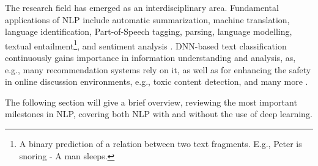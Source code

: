 The research field has emerged as an interdisciplinary area. Fundamental applications of NLP include automatic summarization, machine translation, language identification, Part-of-Speech tagging, parsing, language modelling, textual entailment\footnote{A binary prediction of a relation between two text fragments. E.g., Peter is snoring - A man sleeps.}, and sentiment analysis \cite{mani2001automatic, dostert1955georgetown, tang2017phonetic, schmid1994part, bengio2003neural, socher2013recursive,dagan2005pascal, prabowo2009sentiment}. DNN-based text classification continuously gains importance in information understanding and analysis, as, e.g., many recommendation systems rely on it, as well as for enhancing the safety in online discussion environments, e.g., toxic content detection, and many more \cite{kumar2011natural}. 



The following section will give a brief overview, reviewing the most important milestones in NLP, covering both NLP with and without the use of deep learning.

